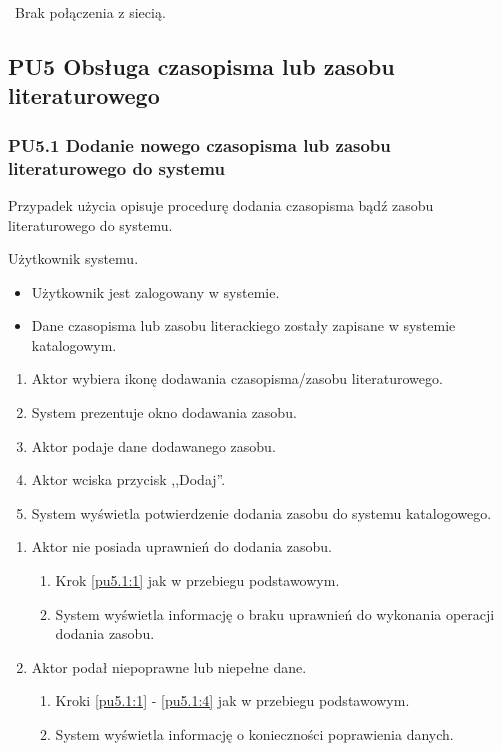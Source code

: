\
Brak połączenia z siecią.

\subsection{PU5 Obsługa czasopisma lub zasobu literaturowego} \label{pu5}
\subsubsection{PU5.1 Dodanie nowego czasopisma lub zasobu literaturowego do systemu}

Przypadek użycia opisuje procedurę dodania czasopisma bądź zasobu literaturowego do systemu.

Użytkownik systemu.

\begin{itemize}
\item Użytkownik jest zalogowany w systemie.
\end{itemize}

\begin{itemize}
\item Dane czasopisma lub zasobu literackiego zostały zapisane w systemie katalogowym.
\end{itemize}

\begin{enumerate}
\item \label{pu5.1:1} Aktor wybiera ikonę dodawania czasopisma/zasobu literaturowego.
\item System prezentuje okno dodawania zasobu.
\item Aktor podaje dane dodawanego zasobu.
\item \label{pu5.1:4} Aktor wciska przycisk ,,Dodaj''.
\item System wyświetla potwierdzenie dodania zasobu do systemu katalogowego.
\end{enumerate}

\begin{enumerate}
\item Aktor nie posiada uprawnień do dodania zasobu.
	\begin{enumerate}[label*=\arabic*.]
		\item Krok \ref{pu5.1:1} jak w przebiegu podstawowym.
		\item System wyświetla informację o braku uprawnień do wykonania operacji dodania zasobu.
	\end{enumerate}
\item Aktor podał niepoprawne lub niepełne dane.
	\begin{enumerate}[label*=\arabic*.]
		\item Kroki \ref{pu5.1:1} - \ref{pu5.1:4} jak w przebiegu podstawowym.
		\item System wyświetla informację o konieczności poprawienia danych.
	\end{enumerate}
\end{enumerate}

